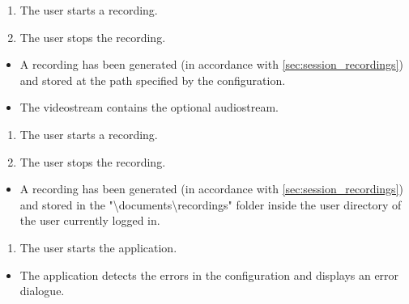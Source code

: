 \begin{tests}
    {\begin{enumerate}
        \item The \gls{user} starts a recording.
        \item The \gls{user} stops the recording.
    \end{enumerate}}
    {\begin{itemize}
        \item A recording has been generated (in accordance with \ref{sec:session_recordings}) and stored at the path specified by the configuration.
        \item The videostream contains the optional audiostream.
    \end{itemize}}

    {\begin{enumerate}
        \item The \gls{user} starts a recording.
        \item The \gls{user} stops the recording.
    \end{enumerate}}
    {\begin{itemize}
        \item A recording has been generated (in accordance with \ref{sec:session_recordings}) and stored in the "\textbackslash documents\textbackslash recordings" folder inside the user directory of the user currently logged in.
    \end{itemize}}

    {\begin{enumerate}
        \item The \gls{user} starts the application.
    \end{enumerate}}
    {\begin{itemize}
        \item The application detects the errors in the configuration and displays an error dialogue.
    \end{itemize}}


\end{tests}
